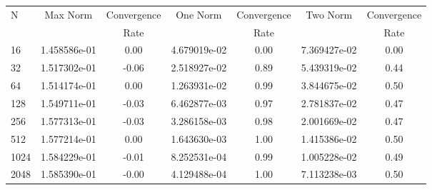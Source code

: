 \documentclass[12pt]{article}
\begin{document}
	\begin{tabular}{l|c|c|c|c|c|c}
		N&Max Norm&Convergence&One Norm&Convergence&Two Norm&Convergence\\
		&&Rate&&Rate&&Rate\\
		\hline
		16&1.458586e-01&0.00&4.679019e-02&0.00&7.369427e-02&0.00\\
		\hline
		32&1.517302e-01&-0.06&2.518927e-02&0.89&5.439319e-02&0.44\\
		\hline
		64&1.514174e-01&0.00&1.263931e-02&0.99&3.844675e-02&0.50\\
		\hline
		128&1.549711e-01&-0.03&6.462877e-03&0.97&2.781837e-02&0.47\\
		\hline
		256&1.577313e-01&-0.03&3.286158e-03&0.98&2.001669e-02&0.47\\
		\hline
		512&1.577214e-01&0.00&1.643630e-03&1.00&1.415386e-02&0.50\\
		\hline
		1024&1.584229e-01&-0.01&8.252531e-04&0.99&1.005228e-02&0.49\\
		\hline
		2048&1.585390e-01&-0.00&4.129488e-04&1.00&7.113238e-03&0.50\\
	\end{tabular}
\end{document}
